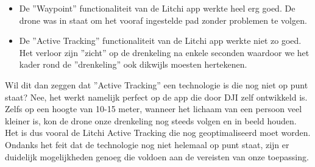 \begin{itemize}
	\item De ''Waypoint'' functionaliteit van de Litchi app werkte heel erg goed. De drone was in staat om het vooraf ingestelde pad zonder problemen te volgen.
	\item De ''Active Tracking'' functionaliteit van de Litchi app werkte niet zo goed. Het verloor zijn ''zicht'' op de drenkeling na enkele seconden waardoor we het kader rond de ''drenkeling'' ook dikwijls moesten hertekenen.
\end{itemize}

Wil dit dan zeggen dat ''Active Tracking'' een technologie is die nog niet op punt staat? Nee, het werkt namelijk perfect op de app die door DJI zelf ontwikkeld is. Zelfs op een hoogte van 10-15 meter, wanneer het lichaam van een persoon veel kleiner is, kon de drone onze drenkeling nog steeds volgen en in beeld houden. Het is dus vooral de Litchi Active Tracking die nog geoptimaliseerd moet worden. Ondanks het feit dat de technologie nog niet helemaal op punt staat, zijn er duidelijk mogelijkheden genoeg die voldoen aan de vereisten van onze toepassing.